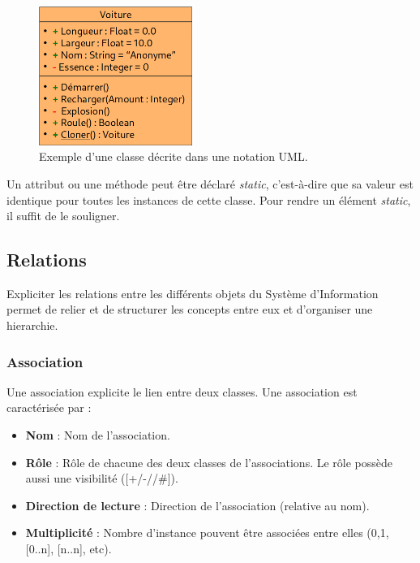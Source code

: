 \documentclass[../Syllabus.tex]{subfiles}
\begin{document}
\begin{figure}[htp]
    \centering
    \includegraphics[width=5cm]{./img/chapter2-uml-example.png}
    \caption{Exemple d'une classe décrite dans une notation UML.}
    \label{fig:chapter2-uml-example}
\end{figure}

Un attribut ou une méthode peut être déclaré \textit{static}, c'est-à-dire que sa valeur est identique pour toutes les instances de cette classe. Pour rendre un élément \textit{static}, il suffit de le souligner.


\subsection{Relations}

Expliciter les relations entre les différents objets du Système d'Information permet de relier et de structurer les concepts entre eux et d'organiser une hierarchie.

\subsubsection{Association}

Une association explicite le lien entre deux classes. Une association est caractérisée par :

\begin{itemize}
  \item \textbf{Nom} : Nom de l'association.
  \item \textbf{Rôle} : Rôle de chacune des deux classes de l'associations. Le rôle possède aussi une visibilité ([+/-/\texttildelow/\#]).
  \item \textbf{Direction de lecture} : Direction de l'association (relative au nom).
  \item \textbf{Multiplicité} : Nombre d'instance pouvent être associées entre elles (0,1,[0..n], [n..n], etc).
\end{itemize}
\end{document}
